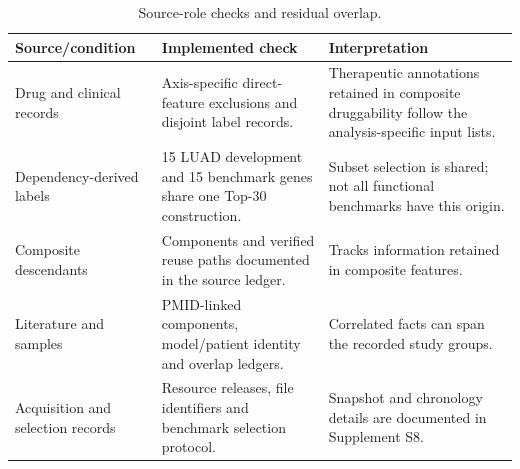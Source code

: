 \begin{table}[!tbp]
\centering\small
\caption{Source-role checks and residual overlap.}\label{tab:source-role-controls}
\begin{tabularx}{\textwidth}{p{}YY}\toprule
Source/condition & Implemented check & Interpretation \\ \midrule
Drug and clinical records & Axis-specific direct-feature exclusions and disjoint label records. & Therapeutic annotations retained in composite druggability follow the analysis-specific input lists. \\
Dependency-derived labels & 15 LUAD development and 15 benchmark genes share one Top-30 construction. & Subset selection is shared; not all functional benchmarks have this origin. \\
Composite descendants & Components and verified reuse paths documented in the source ledger. & Tracks information retained in composite features. \\
Literature and samples & PMID-linked components, model/patient identity and overlap ledgers. & Correlated facts can span the recorded study groups. \\
Acquisition and selection records & Resource releases, file identifiers and benchmark selection protocol. & Snapshot and chronology details are documented in Supplement S8. \\
\bottomrule\end{tabularx}
\end{table}
